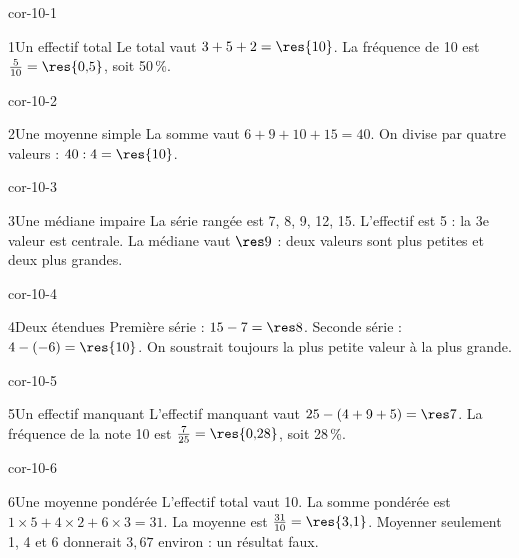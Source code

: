 \clearpage\pagestyle{otMain}\setlength{\otBlocEspacement}{2.5mm}\fontsize{11}{15}\selectfont{}
\begin{blocLivre}{cor-10-1}\begin{corrige}{1}{Un effectif total}
Le total vaut $3+5+2=\res{10}$. La fréquence de 10 est $\frac5{10}=\res{0{,}5}$, soit 50\,\%.
\end{corrige}\end{blocLivre}
\begin{blocLivre}{cor-10-2}\begin{corrige}{2}{Une moyenne simple}
La somme vaut $6+9+10+15=40$. On divise par quatre valeurs : $40:4=\res{10}$.
\end{corrige}\end{blocLivre}
\begin{blocLivre}{cor-10-3}\begin{corrige}{3}{Une médiane impaire}
La série rangée est 7, 8, 9, 12, 15. L’effectif est 5 : la 3e valeur est centrale. La médiane vaut $\res9$ : deux valeurs sont plus petites et deux plus grandes.
\end{corrige}\end{blocLivre}
\begin{blocLivre}{cor-10-4}\begin{corrige}{4}{Deux étendues}
Première série : $15-7=\res8$. Seconde série : $4-(-6)=\res{10}$. On soustrait toujours la plus petite valeur à la plus grande.
\end{corrige}\end{blocLivre}
\begin{blocLivre}{cor-10-5}\begin{corrige}{5}{Un effectif manquant}
L’effectif manquant vaut $25-(4+9+5)=\res7$. La fréquence de la note 10 est $\frac7{25}=\res{0{,}28}$, soit 28\,\%.
\end{corrige}\end{blocLivre}
\begin{blocLivre}{cor-10-6}\begin{corrige}{6}{Une moyenne pondérée}
L’effectif total vaut 10. La somme pondérée est $1\times5+4\times2+6\times3=31$. La moyenne est $\frac{31}{10}=\res{3{,}1}$. Moyenner seulement 1, 4 et 6 donnerait $3{,}67$ environ : un résultat faux.
\end{corrige}\end{blocLivre}
